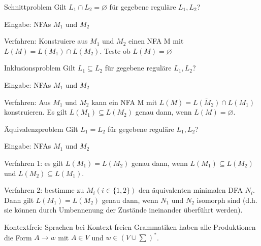 \documentclass[avery5371]{flashcards}
\begin{document}
\begin{flashcard}{Schnittproblem}
Gilt $L_1\cap L_2=\varnothing$ für gegebene reguläre $L_1,L_2$?

Eingabe: NFAs $M_1$ und $M_2$

Verfahren: Konstruiere aus $M_1$ und $M_2$ einen NFA M mit $L(M)=L(M_1)\cap L(M_2)$. Teste ob $L(M)=\varnothing$
\end{flashcard}

\begin{flashcard}{Inklusionsproblem}
Gilt $L_1 \subseteq L_2$ für gegebene reguläre $L_1,L_2$?

Eingabe: NFAs $M_1$ und $M_2$

Verfahren: Aus $M_1$ und $M_2$ kann ein NFA M mit $L(M)=\bar{L(M_2)}\cap L(M_1)$ konstruieren. Es gilt $L(M_1)\subseteq L(M_2)$ genau dann, wenn $L(M)=\varnothing$.
\end{flashcard}

\begin{flashcard}{Äquivalenzproblem}
Gilt $L_1=L_2$ für gegebene reguläre $L_1,L_2$?

Eingabe: NFAs $M_1$ und $M_2$

Verfahren 1: es gilt $L(M_1)=L(M_2)$ genau dann, wenn $L(M_1)\subseteq L(M_2)$ und $L(M_2)\subseteq L(M_1)$.

Verfahren 2: bestimme zu $M_i (i\in\{1,2\})$ den äquivalenten minimalen DFA $N_i$. Dann gilt $L(M_1)=L(M_2)$ genau dann, wenn $N_1$ und $N_2$ isomorph sind (d.h. sie können durch Umbennenung der Zustände ineinander überführt werden).
\end{flashcard}

\begin{flashcard}{Kontextfreie Sprachen}
bei Kontext-freien Grammatiken haben alle Produktionen die Form $A\rightarrow w$ mit $A\in V$ und $w\in (V\cup \sum)^*$.
\end{flashcard}
\end{document}
